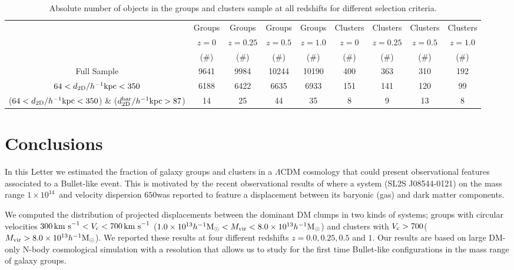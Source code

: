 \documentclass{emulateapj}
\newcommand{\hkpc}{{\ifmmode{h^{-1}{\rm kpc}}\else{$h^{-1}$kpc }\fi}}
\newcommand{\hMsun}{{\ifmmode{h^{-1}{\rm {M_{\odot}}}}\else{$h^{-1}{\rm{M_{\odot}}}$}\fi}}
\newcommand{\kms}{{\ifmmode{{\mathrm{\,km\ s}^{-1}}}\else{\,km~s$^{-1}$}\fi}}
\newcommand{\bullg}{SL2S J08544-0121}
\begin{document}
  
\begin{table}
\begin{center}
\begin{tabular}{ccccccccc}\hline\hline
        & Groups & Groups & Groups & Groups & Clusters & Clusters & Clusters & Clusters\\
  & $z=0$   & $z=0.25$   & $z=0.5$   & $z=1.0$   & $z=0$   & $z=0.25$   & $z=0.5$   & $z=1.0$ \\
  & ($\# $)    & ($\# $)    & ($\# $)    & ($\# $)    & ($\# $)    & ($\# $)    & ($\# $)    & ($\# $)  \\\hline
Full Sample & 9641 & 9984 & 10244 & 10190 & 400  & 363 & 310 & 192 \\
$64 <d_{\rm 2D}/\hkpc< 350$ & 6188 & 6422 & 6635 & 6933 & 151 &
141 & 120 & 99\\
($64 <d_{\rm 2D}/\hkpc< 350 $) \& ($d_{\rm 2D}^{\rm bar}/\hkpc >87$) & 14 & 25 & 44 & 35 & 8 & 9 & 13 & 8 \\\hline\hline
\end{tabular}
\caption{Absolute number of objects in the groups and clusters sample
  at all redshifts for different selection criteria. }
\label{table:numbers}
\end{center}
\end{table}





\section{Conclusions}
\label{sec:conclusions}

In this Letter we estimated the fraction of galaxy groups and clusters
in a $\Lambda$CDM cosmology that could present observational features
associated to a Bullet-like event. This is motivated by the recent
observational results of \cite{Gastaldello} where a system (\bullg)
on the mass range $1\times 10^{14}$\hMsun\ and velocity dispersion
$650$\kms was reported to feature a displacement between its baryonic
(gas) and dark matter components. 

We computed the distribution of projected displacements
between the dominant DM clumps in two kinds of systems; groups with
circular velocities $300\kms<V_{\rm c}<700\kms$ ($1.0\times
10^{13}\hMsun < M_{\rm vir}<8.0\times 10^{13}\hMsun$) and clusters with $V_{\rm
  c}>700$\kms ($M_{\rm vir}>8.0\times 10^{13}\hMsun$). We reported these
results at four different redshifts $z=0.0,0.25,0.5$ and $1$. Our
results are based on large DM-only N-body cosmological simulation with
a resolution that allows us to study for the first time Bullet-like
configurations in the mass range of galaxy groups. 
\end{document}

